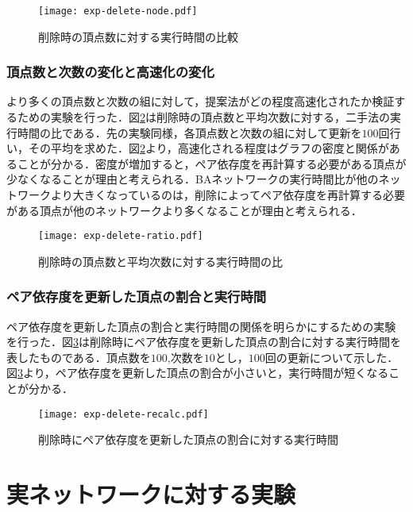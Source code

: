 \begin{figure}[tb]
  \centering
  \texttt{[image: exp-delete-node.pdf]}
  \caption{削除時の頂点数に対する実行時間の比較}
  \label{fig:exp-delete-node}
\end{figure}

\subsubsection{頂点数と次数の変化と高速化の変化}
より多くの頂点数と次数の組に対して，提案法がどの程度高速化されたか検証するための実験を行った．図\ref{fig:exp-delete-ratio}は削除時の頂点数と平均次数に対する，二手法の実行時間の比である．先の実験同様，各頂点数と次数の組に対して更新を$100$回行い，その平均を求めた．図\ref{fig:exp-delete-ratio}より，高速化される程度はグラフの密度と関係があることが分かる．密度が増加すると，ペア依存度を再計算する必要がある頂点が少なくなることが理由と考えられる．BAネットワークの実行時間比が他のネットワークより大きくなっているのは，削除によってペア依存度を再計算する必要がある頂点が他のネットワークより多くなることが理由と考えられる．

\begin{figure}[tb]
  \centering
  \texttt{[image: exp-delete-ratio.pdf]}
  \caption{削除時の頂点数と平均次数に対する実行時間の比}
  \label{fig:exp-delete-ratio}
\end{figure}

\subsubsection{ペア依存度を更新した頂点の割合と実行時間}
ペア依存度を更新した頂点の割合と実行時間の関係を明らかにするための実験を行った．図\ref{fig:exp-delete-recalc}は削除時にペア依存度を更新した頂点の割合に対する実行時間を表したものである．頂点数を$100$,次数を$10$とし，$100$回の更新について示した．図\ref{fig:exp-delete-recalc}より，ペア依存度を更新した頂点の割合が小さいと，実行時間が短くなることが分かる．

\begin{figure}[tb]
  \centering
  \texttt{[image: exp-delete-recalc.pdf]}
  \caption{削除時にペア依存度を更新した頂点の割合に対する実行時間}
  \label{fig:exp-delete-recalc}
\end{figure}

\section{実ネットワークに対する実験}

